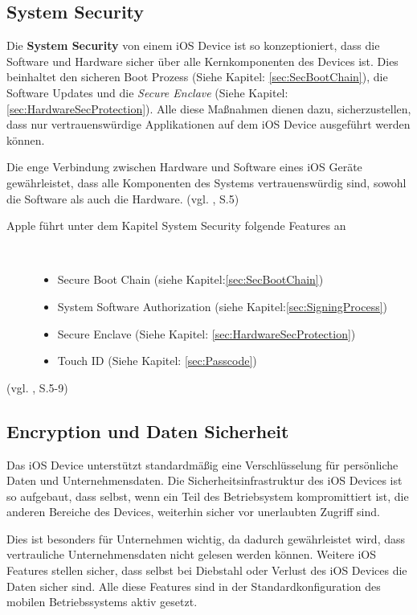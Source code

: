 \subsection{System Security}
\label{sec:SystemSec}
Die \textbf{System Security} von einem iOS Device ist so kon­zep­ti­o­nie­rt, dass die Software und Hardware sicher über alle Kernkomponenten des Devices ist. Dies beinhaltet den sicheren Boot Prozess (Siehe Kapitel: \ref{sec:SecBootChain}), die Software Updates und die \textit{\glqq Secure Enclave \grqq{}} (Siehe Kapitel: \ref{sec:HardwareSecProtection}). Alle diese Maßnahmen dienen dazu, sicherzustellen, dass nur vertrauenswürdige Applikationen auf dem iOS Device ausgeführt werden können.\par 

Die enge Verbindung zwischen Hardware und Software eines iOS Geräte gewährleistet, dass alle Komponenten des Systems vertrauenswürdig sind, sowohl die Software als auch die Hardware. (vgl. \cite{Apple[4]}, S.5)
\begin{description}
\item[Apple führt unter dem Kapitel System Security folgende Features an]~\par
	\begin{itemize}
		\item Secure Boot Chain (siehe Kapitel:\ref{sec:SecBootChain})
 		\item System Software Authorization (siehe Kapitel:\ref{sec:SigningProcess})
 		\item Secure Enclave (Siehe Kapitel: \ref{sec:HardwareSecProtection})
 		\item Touch ID (Siehe Kapitel: \ref{sec:Passcode})
        \end{itemize}
\end{description}
(vgl. \cite{Apple[4]}, S.5-9)

\subsection{Encryption und Daten Sicherheit}
\label{sec:DataEnc}

Das iOS Device unterstützt standardmäßig eine Verschlüsselung für persönliche Daten und Unternehmensdaten. Die Sicherheitsinfrastruktur des iOS Devices ist so aufgebaut, dass selbst, wenn ein Teil des Betriebsystem kompromittiert ist, die anderen Bereiche des Devices, weiterhin sicher vor unerlaubten Zugriff sind. \par
Dies ist besonders für Unternehmen wichtig, da dadurch gewährleistet wird, dass vertrauliche Unternehmensdaten nicht gelesen werden können. Weitere iOS Features stellen sicher, dass selbst bei Diebstahl oder Verlust des iOS Devices die Daten sicher sind. Alle diese Features sind in der Standardkonfiguration des mobilen Betriebssystems aktiv gesetzt.

